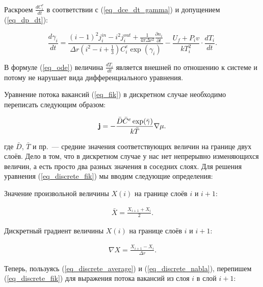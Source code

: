 \documentclass[12pt, a4paper]{article}
\begin{document}
Раскроем $\frac{dC^e_i}{dt}$ в соответствии с (\ref{eq_dce_dt_gamma}) и допущением (\ref{eq_dp_dt}):

\begin{equation}
\label{eq_ode}
\boxed{
\frac{d \gamma_i}{d t} =
 \frac{ \left(i - 1 \right)^2 j_i^{in} - i^2 j_i^{out} + \frac{1}{4 \pi \Delta r^2} \frac{\partial n_i}{\partial t} } { \Delta r \left( i^2 - i + \frac{1}{3} \right) C^e_i \exp(\gamma_i) }
 - \frac{U_f + P_iv}{kT^2_i} \cdot \frac{dT_i}{dt}.
}
\end{equation}

В формуле (\ref{eq_ode}) величина $\frac{dT_i}{dt}$ является внешней по отношению к системе и потому не нарушает вида дифференциального уравнения.

Уравнение потока вакансий (\ref{eq_fik}) в дискретном случае необходимо переписать следующим образом:

\begin{equation}
\label{eq_discrete_fik}
{\bf j}=-\frac{\bar{D}\bar{C}^e \exp(\bar{\gamma})}{k\bar{T}}\nabla \mu.
\end{equation}

\noindent где $\bar{D}$, $\bar{T}$ и пр.~--- средние значения соответствующих величин на границе двух слоёв. Дело в том, что в дискретном случае у нас нет непрерывно изменяющихся величин, а есть просто два разных значения в соседних слоях. Для решения уравнения (\ref{eq_discrete_fik}) мы вводим следующие определения:

Значение произвольной величины $X(i)$ на границе слоёв $i$ и $i+1$:

\begin{equation}
\label{eq_discrete_average}
\begin{aligned}
\bar{X} = \frac{X_{i+1} + X_i}{2}.
\end{aligned}
\end{equation}

Дискретный градиент величины $X(i)$ на границе слоёв $i$ и $i+1$:

\begin{equation}
\label{eq_discrete_nabla}
\begin{aligned}
\nabla X = \frac{X_{i+1} - X_i}{\Delta r}.
\end{aligned}
\end{equation}

Теперь, пользуясь (\ref{eq_discrete_average}) и (\ref{eq_discrete_nabla}), перепишем (\ref{eq_discrete_fik}) для выражения потока вакансий из слоя $i$ в слой $i+1$:
\end{document}
